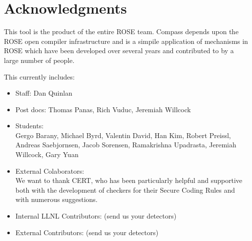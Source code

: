 \section*{Acknowledgments}

   This tool is the product of the entire ROSE team. Compass
depends upon the ROSE open compiler infrastructure and is a
simpile application of mechanisms in ROSE which have been 
developed over several years and contributed to by a large 
number of people.

This currently includes:

\begin{itemize}
   \item Staff: Dan Quinlan
   \item Post docs: Thomas Panas, Rich Vuduc, Jeremiah Willcock
   \item Students: \\
         Gergo Barany, Michael Byrd, Valentin David, Han Kim, Robert Preissl,
         Andreas Saebjornsen, Jacob Sorensen, Ramakrishna Upadrasta, 
         Jeremiah Willcock, Gary Yuan
   \item External Colaborators: \\ 
         We want to thank CERT, who has been particularly helpful and supportive both
         with the development of checkers for their Secure Coding Rules and with 
         numerous suggestions.
   \item Internal LLNL Contributors: (send us your detectors)
   \item External Contributors: (send us your detectors)
\end{itemize}

